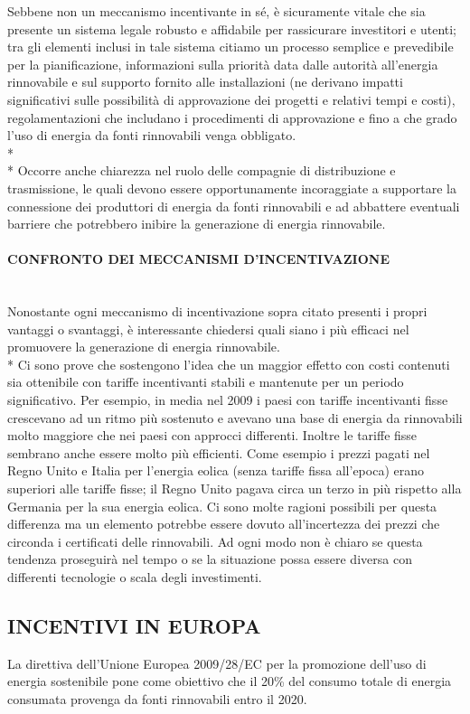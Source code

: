 \documentclass[12pt,a4paper,openright,twoside]{report}
\newcommand{\myparagraph}[1]{\paragraph{#1}\mbox{}\\}
\begin{document}
Sebbene non un meccanismo incentivante in sé, è sicuramente vitale che sia presente un sistema legale robusto e affidabile per rassicurare investitori e utenti; tra gli elementi inclusi in tale sistema citiamo un processo semplice e prevedibile per la pianificazione, informazioni sulla priorità data dalle autorità all'energia rinnovabile e sul supporto fornito alle installazioni (ne derivano impatti significativi sulle possibilità di approvazione dei progetti e relativi tempi e costi), regolamentazioni che includano i procedimenti di approvazione e fino a che grado l'uso di energia da fonti rinnovabili venga obbligato.\\*\\* 
Occorre anche chiarezza nel ruolo delle compagnie di distribuzione e trasmissione, le quali devono essere opportunamente incoraggiate a supportare la connessione dei produttori di energia da fonti rinnovabili e ad abbattere eventuali barriere che potrebbero inibire la generazione di energia rinnovabile.

\myparagraph{CONFRONTO DEI MECCANISMI D'INCENTIVAZIONE}
Nonostante ogni meccanismo di incentivazione sopra citato presenti i propri vantaggi o svantaggi, è interessante chiedersi quali siano i più efficaci nel promuovere la generazione di energia rinnovabile.\\*
Ci sono prove che sostengono l'idea che un maggior effetto con costi contenuti sia ottenibile con tariffe incentivanti stabili e mantenute per un periodo significativo. Per esempio, in media nel 2009 i paesi con tariffe incentivanti fisse crescevano ad un ritmo più sostenuto e avevano una base di energia da rinnovabili molto maggiore che nei paesi con approcci differenti. Inoltre le tariffe fisse sembrano anche essere molto più efficienti. Come esempio i prezzi pagati nel Regno Unito e Italia per l'energia eolica (senza tariffe fissa all'epoca) erano superiori alle tariffe fisse; il Regno Unito pagava circa un terzo in più rispetto alla Germania  per la sua energia eolica. Ci sono molte ragioni possibili per questa differenza ma un elemento potrebbe essere dovuto all'incertezza dei prezzi che circonda i certificati delle rinnovabili. Ad ogni modo non è chiaro se questa tendenza proseguirà nel tempo o se la situazione possa essere diversa con differenti tecnologie o scala degli investimenti. 

\subsection[INCENTIVI EUROPEI]{\nohyphens{INCENTIVI IN EUROPA}}
La direttiva dell'Unione Europea 2009/28/EC per la promozione dell'uso di energia sostenibile pone come obiettivo che il 20\% del consumo totale di energia consumata provenga da fonti rinnovabili entro il 2020.
\end{document}
